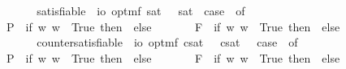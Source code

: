 \begin{isabellebody}
\ \ \ \ {\isacharunderscore}\ {\isasymRightarrow}\ {\isacharasterisk}{\isachardoublequoteclose}\isanewline
\ \isamarkupfalse%
\ satisfiable\ {\isacharcolon}{\isacharcolon}\ {\isachardoublequoteopen}io\ opt{\isasymRightarrow}mf{\isachardoublequoteclose}\ {\isacharparenleft}{\isachardoublequoteopen}{\isacharbrackleft}{\isacharunderscore}{\isacharbrackright}\isactrlsup s\isactrlsup a\isactrlsup t{\isachardoublequoteclose}\ {\isacharbrackleft}{}{\isacharbrackright}{\isacharparenright}\ \ {\isachardoublequoteopen}{\isacharbrackleft}{\isasymphi}{\isacharbrackright}\isactrlsup s\isactrlsup a\isactrlsup t\ {\isasymequiv}\ case\ {\isasymphi}\ of\ \isanewline
\ \ \ \ P{\isacharparenleft}{\isasympsi}{\isacharparenright}\ {\isasymRightarrow}\ if\ {\isasymexists}w{\isachardot}{\isacharparenleft}{\isasympsi}\ w{\isacharparenright}\ {\isasymlongleftrightarrow}\ True\ then\ {\isasymtop}\ else\ {\isasymbottom}\ {\isacharbar}\ \isanewline
\ \ \ \ F{\isacharparenleft}{\isasympsi}{\isacharparenright}\ {\isasymRightarrow}\ if\ {\isasymexists}w{\isachardot}{\isacharparenleft}{\isasympsi}\ w{\isacharparenright}\ {\isasymlongleftrightarrow}\ True\ then\ {\isasymtop}\ else\ {\isasymbottom}\ {\isacharbar}\ \isanewline
\ \ \ \ {\isacharunderscore}\ {\isasymRightarrow}\ {\isacharasterisk}{\isachardoublequoteclose}\isanewline
\ \isamarkupfalse%
\ countersatisfiable\ {\isacharcolon}{\isacharcolon}\ {\isachardoublequoteopen}io\ opt{\isasymRightarrow}mf{\isachardoublequoteclose}\ {\isacharparenleft}{\isachardoublequoteopen}{\isacharbrackleft}{\isacharunderscore}{\isacharbrackright}\isactrlsup c\isactrlsup s\isactrlsup a\isactrlsup t{\isachardoublequoteclose}\ {\isacharbrackleft}{}{\isacharbrackright}{\isacharparenright}\ \ {\isachardoublequoteopen}{\isacharbrackleft}{\isasymphi}{\isacharbrackright}\isactrlsup c\isactrlsup s\isactrlsup a\isactrlsup t\ {\isasymequiv}\ \ case\ {\isasymphi}\ of\ \isanewline
\ \ \ \ P{\isacharparenleft}{\isasympsi}{\isacharparenright}\ {\isasymRightarrow}\ if\ {\isasymexists}w{\isachardot}{\isasymnot}{\isacharparenleft}{\isasympsi}\ w{\isacharparenright}\ {\isasymlongleftrightarrow}\ True\ then\ {\isasymtop}\ else\ {\isasymbottom}\ {\isacharbar}\ \isanewline
\ \ \ \ F{\isacharparenleft}{\isasympsi}{\isacharparenright}\ {\isasymRightarrow}\ if\ {\isasymexists}w{\isachardot}{\isasymnot}{\isacharparenleft}{\isasympsi}\ w{\isacharparenright}\ {\isasymlongleftrightarrow}\ True\ then\ {\isasymtop}\ else\ {\isasymbottom}\ {\isacharbar}\ \isanewline
\ \ \ \ {\isacharunderscore}\ {\isasymRightarrow}\ {\isacharasterisk}{\isachardoublequoteclose}\isanewline

\end{isabellebody}
